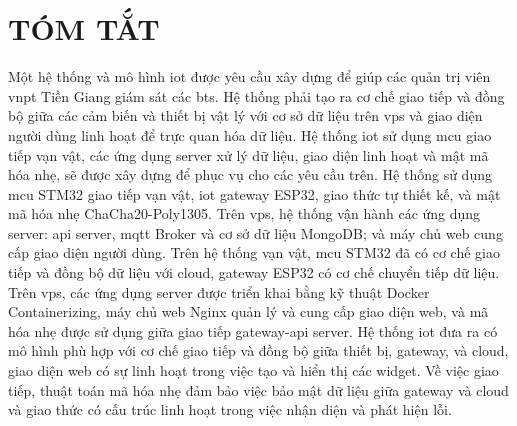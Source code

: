 \chapter*{TÓM TẮT}
\label{Abstract}

Một hệ thống và mô hình \acrfull{iot} được yêu cầu xây dựng để giúp các quản trị viên \acrfull{vnpt} Tiền Giang giám sát các \acrfull{bts}. Hệ thống phải tạo ra cơ chế giao tiếp và đồng bộ giữa các cảm biến và thiết bị vật lý với cơ sở dữ liệu trên \acrfull{vps} và giao diện người dùng linh hoạt để trực quan hóa dữ liệu. 
Hệ thống \acrshort{iot} sử dụng \acrfull{mcu} giao tiếp vạn vật, các ứng dụng server xử lý dữ liệu, giao diện linh hoạt và mật mã hóa nhẹ, sẽ được xây dựng để phục vụ cho các yêu cầu trên. 
Hệ thống sử dụng \acrshort{mcu} STM32 giao tiếp vạn vật, \acrshort{iot} gateway ESP32, giao thức tự thiết kế, và mật mã hóa nhẹ ChaCha20-Poly1305. Trên \acrshort{vps}, hệ thống vận hành các ứng dụng server: \acrfull{api} server, \acrfull{mqtt} Broker và cơ sở dữ liệu MongoDB; và máy chủ web cung cấp giao diện người dùng. 
Trên hệ thống vạn vật, \acrshort{mcu} STM32 đã có cơ chế giao tiếp và đồng bộ dữ liệu với cloud, gateway ESP32 có cơ chế chuyển tiếp dữ liệu. Trên \acrshort{vps}, các ứng dụng server được triển khai bằng kỹ thuật Docker Containerizing, máy chủ web Nginx quản lý và cung cấp giao diện web, và mã hóa nhẹ được sử dụng giữa giao tiếp gateway-\acrshort{api} server. 
Hệ thống \acrshort{iot} đưa ra có mô hình phù hợp với cơ chế giao tiếp và đồng bộ giữa thiết bị, gateway, và cloud, giao diện web có sự linh hoạt trong việc tạo và hiển thị các widget. Về việc giao tiếp, thuật toán mã hóa nhẹ đảm bảo việc bảo mật dữ liệu giữa gateway và cloud và giao thức có cấu trúc linh hoạt trong việc nhận diện và phát hiện lỗi.